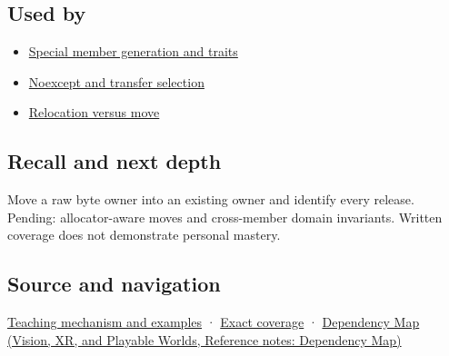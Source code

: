 \subsection{Used by}\label{appendix-5636651017c2-used-by}

\hypertarget{appendix-5636651017c2-used-by}{}

\begin{itemize}
\tightlist
\item
  \hyperref[appendix-42e02a12c694]{Special member generation and traits}
\item
  \hyperref[appendix-c746afaa47d1]{Noexcept and transfer selection}
\item
  \hyperref[appendix-adfd6397af8d]{Relocation versus move}
\end{itemize}

\subsection{Recall and next depth}\label{appendix-5636651017c2-recall-and-next-depth}

\hypertarget{appendix-5636651017c2-recall-and-next-depth}{}

Move a raw byte owner into an existing owner and identify every release. Pending: allocator-aware moves and cross-member domain invariants. Written coverage does not demonstrate personal mastery.

\subsection{Source and navigation}\label{appendix-5636651017c2-source-and-navigation}

\hypertarget{appendix-5636651017c2-source-and-navigation}{}

\hyperref[01-foundations-i-ch003-a-move-transfers-responsibility-while-the-source-survives]{Teaching mechanism and examples} · \hyperref[appendix-fd090d982a15-m009---parts-127-147]{Exact coverage} · \href{../07-Vision-XR-and-Playable-Worlds/main.pdf\#nameddest=appendix-4ad47bdd269a}{Dependency Map (Vision, XR, and Playable Worlds, Reference notes: Dependency Map)}
